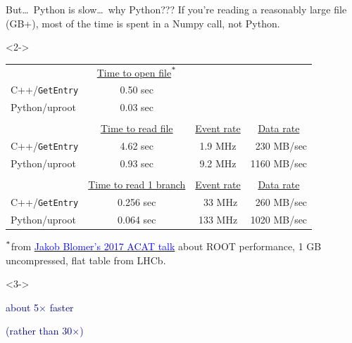 \documentclass[aspectratio=169]{beamer}
\begin{document}
\begin{frame}{But\ldots\ Python is slow\ldots\ why Python???}
\vspace{0.4 cm}
{\large If you're reading a reasonably large file (GB+), most of the time is spent in a Numpy call, not Python.}

\vspace{0.3 cm}
\begin{uncoverenv}<2->
\begin{tabular}{l c c c}
& \underline{Time to open file}$^{\mbox{\scriptsize *}}$ & & \\
C++/{\tt GetEntry} & 0.50 sec & & \\
Python/uproot & 0.03 sec & & \\
& & & \\
 & \underline{Time to read file} & \underline{Event rate} & \underline{Data rate} \\
C++/{\tt GetEntry} & 4.62 sec & 1.9 MHz & \textcolor{white}{0}230 MB/sec \\
Python/uproot & 0.93 sec & 9.2 MHz & 1160 MB/sec \\
& & & \\
& \underline{Time to read 1 branch} & \underline{Event rate} & \underline{Data rate} \\
C++/{\tt GetEntry} & 0.256 sec & \textcolor{white}{0}33 MHz & \textcolor{white}{0}260 MB/sec \\
Python/uproot & 0.064 sec & 133 MHz & 1020 MB/sec
\end{tabular}

\vspace{0.5 cm}
{\scriptsize $^{\mbox{\scriptsize *}}$from \href{https://indico.cern.ch/event/567550/contributions/2628878/}{\textcolor{blue}{Jakob Blomer's 2017 ACAT talk}} about ROOT performance, 1 GB uncompressed, flat table from LHCb.}
\end{uncoverenv}

\vspace{-6.1 cm}\hfill\begin{minipage}{0.35\linewidth}
\begin{uncoverenv}<3->
\begin{center}
\large
\textcolor{darkblue}{about 5$\times$ faster}

\vspace{0.1 cm}
\textcolor{darkblue}{(rather than 30$\times$)}
\end{center}
\end{uncoverenv}
\vspace{6.1 cm}
\end{minipage}
\end{frame}
\end{document}
